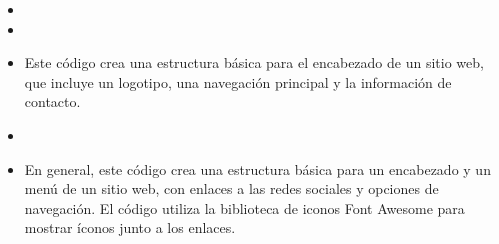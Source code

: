 \documentclass{article}
\begin{document}
\begin{itemize}
     \item[ ]{}
     
      \item[ ]{}
      \item Este código crea una estructura básica para el encabezado de un sitio web, que incluye un logotipo, una navegación principal y la información de contacto.
      
      \item[ ]{}

     \item En general, este código crea una estructura básica para un encabezado y un menú de un sitio web, con enlaces a las redes sociales y opciones de navegación. El código utiliza la biblioteca de iconos Font Awesome para mostrar íconos junto a los enlaces.
        

\end{itemize}
\end{document}
